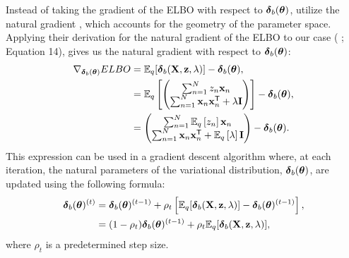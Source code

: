 \documentclass[]{article}
\newcommand{\Tra}{^{\sf T}} %
\newcommand{\V}[1]{{\bm{\mathbf{\MakeLowercase{#1}}}}} %
\def\I{{\bf I}}
\def\X{{\bf X}}
\def\x{{\bf x}}
\def\z{{\bf z}}
\def \vdelta{{\V{\delta}}}
\def \vtheta{{\V{\theta}}}
\newcommand{\Eq}{\mathbb{E}_{q}}
\begin{document}
Instead of taking the gradient of the ELBO with respect to $\vdelta_b(\vtheta)$,
\citet{hoffman2013svi} utilize the natural gradient \citep{amari1998natural},
which accounts for the geometry of the parameter space.  Applying their
derivation for the natural gradient of the ELBO to our case
(\citet{hoffman2013svi} ; Equation 14), gives us the natural gradient with
respect to $\vdelta_b(\vtheta)$: 
\begin{align}
\label{eq:natural_grad}
\begin{split}
\nabla_{\vdelta_b(\vtheta)} ELBO & = \Eq[\vdelta_b(\X, \z, \lambda)] - 
\vdelta_b(\vtheta), \\
& = 
\Eq \left[ 
\begin{pmatrix}
\sum_{n = 1}^N z_n \x_n \\
\sum_{n = 1}^N \x_n \x_n\Tra + \lambda \I 
\end{pmatrix}
\right] - \vdelta_b(\vtheta), \\
& = 
\begin{pmatrix}
\sum_{n = 1}^N \Eq \left[ z_n \right] \x_n \\
\sum_{n = 1}^N \x_n \x_n\Tra + \Eq \left[ \lambda \right] \I 
\end{pmatrix} - \vdelta_b(\vtheta).
\end{split}
\end{align}
This expression can be used in a gradient descent algorithm where, at each
iteration, the natural parameters of the variational distribution,
$\vdelta_b(\vtheta)$, are updated using the following formula: 
\begin{align}
\label{eq:gradient_step}
\begin{split}
\vdelta_b(\vtheta)^{(t)} & = \vdelta_b(\vtheta)^{(t-1)} + 
\rho_t \left[ 
\Eq[\vdelta_b(\X, \z, \lambda)] - \vdelta_b(\vtheta)^{(t-1)}
\right], \\
& = (1 - \rho_t) \vdelta_b(\vtheta)^{(t-1)} + 
\rho_t \Eq[\vdelta_b(\X, \z, \lambda)] ,
\end{split}
\end{align}
%
where $\rho_t$ is a predetermined step size. 
\end{document}
